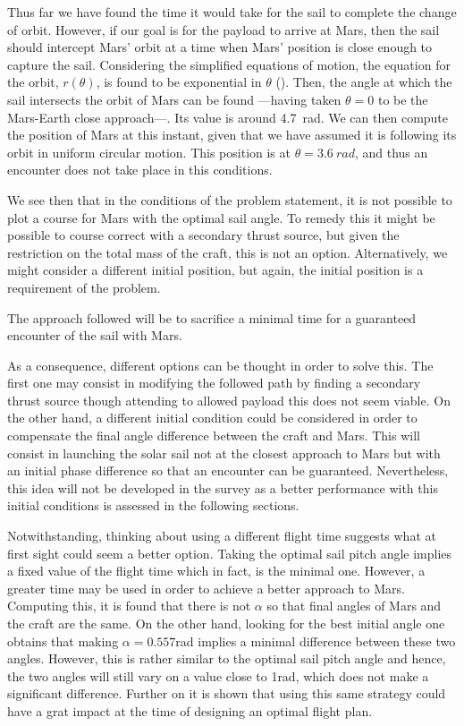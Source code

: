 \documentclass[twocolumn,12pt,a4paper]{article}
\numberwithin{equation}{section}
\begin{document}
Thus far we have found the time it would take for the sail to complete the change of orbit. However, if our goal is for the payload to arrive at Mars, then the sail should intercept Mars' orbit at a time when Mars' position is close enough to capture the sail. Considering the simplified equations of motion, the equation for the orbit, \( r(\theta) \), is found to be exponential in \( \theta \) (\cite[p. 155]{mcinnes}). Then, the angle at which the sail intersects the orbit of Mars can be found ---having taken \( \theta = 0	\) to be the Mars-Earth close approach---. Its value is around \SI{4.7}{rad}. We can then compute the position of Mars at this instant, given that we have assumed it is following its orbit in uniform circular motion. This position is at \( \theta = \SI{3.6}{rad} \), and thus an encounter does not take place in this conditions.

We see then that in the conditions of the problem statement, it is not possible to plot a course for Mars with the optimal sail angle. To remedy this it might be possible to course correct with a secondary thrust source, but given the restriction on the total mass of the craft, this is not an option. Alternatively, we might consider a different initial position, but again, the initial position is a requirement of the problem.

The approach followed will be to sacrifice a minimal time for a guaranteed encounter of the sail with Mars.

As a consequence, different options can be thought in order to solve this. The first one may consist in modifying the followed path by finding a secondary thrust source though attending to allowed payload this does not seem viable. On the other hand, a different initial condition could be considered in order to compensate the final angle difference between the craft and Mars. This will consist in launching the solar sail not at the closest approach to Mars but with an initial phase difference so that an encounter can be guaranteed. Nevertheless, this idea will not be developed in the survey as a better performance with this initial conditions is assessed in the following sections.
 
Notwithstanding, thinking about using a different flight time suggests what at first sight could seem a better option. Taking the optimal sail pitch angle implies a fixed value of the flight time which in fact, is the minimal one. However, a greater time may be used in order to achieve a better approach to Mars. Computing this, it is found that there is not $\alpha$ so that final angles of Mars and the craft are the same. On the other hand, looking for the best initial angle one obtains that making $\alpha=0.557$rad implies a minimal difference between these two angles. However, this is rather similar to the optimal sail pitch angle and hence, the two angles will still vary on a value close to 1rad, which does not make a significant difference. Further on it is shown that using this same strategy could have a grat impact at the time of designing an optimal flight plan.
\end{document}
